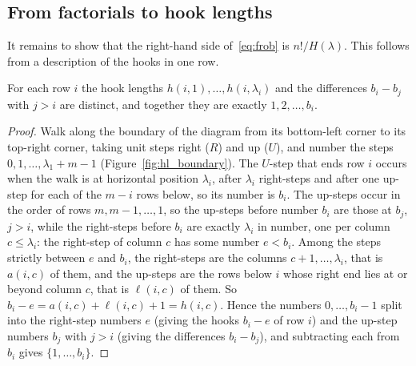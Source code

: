 \documentclass[11pt]{article}
\begin{document}
\subsection{From factorials to hook lengths}
It remains to show that the right-hand side of~\eqref{eq:frob} is $n!/H(\lambda)$. This follows from a description of the hooks in one row.

\begin{theorembox}
For each row $i$ the hook lengths $h(i,1),\dots,h(i,\lambda_i)$ and the differences $b_i-b_j$ with $j>i$ are distinct, and together they are exactly $1,2,\dots,b_i$.
\end{theorembox}
\begin{proof}
Walk along the boundary of the diagram from its bottom-left corner to its top-right corner, taking unit steps right ($R$) and up ($U$), and number the steps $0,1,\dots,\lambda_1+m-1$ (Figure~\ref{fig:hl_boundary}).
The $U$-step that ends row $i$ occurs when the walk is at horizontal position $\lambda_i$, after $\lambda_i$ right-steps and after one up-step for each of the $m-i$ rows below, so its number is $b_i$.
The up-steps occur in the order of rows $m,m-1,\dots,1$, so the up-steps before number $b_i$ are those at $b_j$, $j>i$, while the right-steps before $b_i$ are exactly $\lambda_i$ in number, one per column $c\le\lambda_i$:
the right-step of column $c$ has some number $e<b_i$. Among the steps strictly between $e$ and $b_i$, the right-steps are the columns $c+1,\dots,\lambda_i$, that is $a(i,c)$ of them, and the up-steps are the rows below $i$ whose right end lies at or beyond column $c$, that is $\ell(i,c)$ of them. So $b_i-e=a(i,c)+\ell(i,c)+1=h(i,c)$.
Hence the numbers $0,\dots,b_i-1$ split into the right-step numbers $e$ (giving the hooks $b_i-e$ of row $i$) and the up-step numbers $b_j$ with $j>i$ (giving the differences $b_i-b_j$), and subtracting each from $b_i$ gives $\{1,\dots,b_i\}$.
\end{proof}
\end{document}
